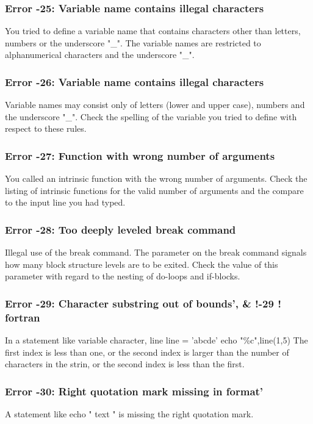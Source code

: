 \subsubsection{Error -25: Variable name contains illegal characters}
\par
You tried to define a variable name that contains characters other 
than letters, numbers or the underscore "\_". 
The variable names are restricted to alphanumerical characters and 
the underscore "\_". 
\subsubsection{Error -26: Variable name contains illegal characters}
\par
Variable names may consist only of letters (lower and upper case), 
numbers and the underscore "\_". Check the spelling of the variable 
you tried to define with respect to these rules. 
\subsubsection{Error -27: Function with wrong number of arguments}
\par
You called an intrinsic function with the wrong number of arguments. 
Check the listing of intrinsic functions for the valid number of 
arguments and the compare to the input line you had typed. 
\subsubsection{Error -28: Too deeply leveled break command}
\par
Illegal use of the break command. The parameter on the break command 
signals how many block structure levels are to be exited. Check the 
value of this parameter with regard to the nesting of do-loops and 
if-blocks. 
\subsubsection{Error -29: Character substring out of bounds',        \& !-29  ! fortran}
\par
In a statement like 
variable character, line 
line = 'abcde' 
echo "\%c",line(1,5) 
The first index is  less than one, or the second index is larger than 
the number of characters in the strin, or the second index is less 
than the first. 
\subsubsection{Error -30: Right quotation mark missing in format'}
\par
A statement like 
echo " text " 
is missing the right quotation mark. 
